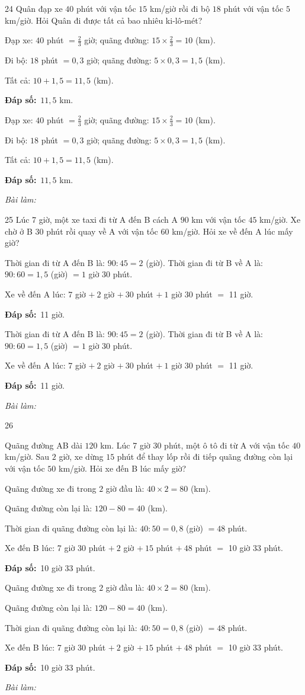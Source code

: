 \documentclass[11pt]{article}
\newif\ifsol \soltrue
\providecommand{\AnsWord}{Đáp số}
\newcommand{\dapso}[1]{\par\textbf{\AnsWord:}\ #1}
\newcommand{\probsol}[1]{%
  \begin{lrbox}{\solmeasure}\begin{minipage}{\dimexpr\linewidth-24pt\relax}#1\end{minipage}\end{lrbox}%
  \ifsol
    \begin{solbox}#1\end{solbox}%
  \else
    \setlength{\solht}{\dimexpr\ht\solmeasure+\dp\solmeasure+0.85cm\relax}%
    \ifdim\solht<1.35cm\setlength{\solht}{1.35cm}\fi
    \begin{tcolorbox}[colback=white,colframe=Line,boxrule=0.8pt,arc=5pt,
      left=8pt,right=8pt,top=4pt,bottom=4pt,height=\solht]{\footnotesize\color{Slate}\itshape\WorkWord}\end{tcolorbox}%
  \fi}
\newcommand{\gap}{\vspace{0.3cm}}
\def\WorkWord{Bài làm:}
\def\AnsWord{Đáp số}
\begin{document}
\gap
\begin{probbox}{24}{\relax}
Quân đạp xe $40$ phút với vận tốc $15$ km/giờ rồi đi bộ $18$ phút với vận tốc $5$ km/giờ. Hỏi Quân đi được tất cả bao nhiêu ki-lô-mét?
\end{probbox}
\probsol{
Đạp xe: $40$ phút $=\frac23$ giờ; quãng đường: $15\times\frac23=10$ (km).\par
Đi bộ: $18$ phút $=0{,}3$ giờ; quãng đường: $5\times0{,}3=1{,}5$ (km).\par
Tất cả: $10+1{,}5=11{,}5$ (km).
\dapso{$11{,}5$ km.}}
\gap
\begin{probbox}{25}{\relax}
Lúc 7 giờ, một xe taxi đi từ A đến B cách A $90$ km với vận tốc $45$ km/giờ. Xe chờ ở B $30$ phút rồi quay về A với vận tốc $60$ km/giờ. Hỏi xe về đến A lúc mấy giờ?
\end{probbox}
\probsol{
Thời gian đi từ A đến B là: $90:45=2$ (giờ). Thời gian đi từ B về A là: $90:60=1{,}5$ (giờ) $=1$ giờ $30$ phút.\par
Xe về đến A lúc: 7 giờ $+\ 2$ giờ $+\ 30$ phút $+\ 1$ giờ $30$ phút $=$ 11 giờ.
\dapso{11 giờ.}}
\gap
\begin{probbox}{26}{\relax}
\begin{minipage}[t]{0.56\linewidth}
Quãng đường AB dài $120$ km. Lúc 7 giờ 30 phút, một ô tô đi từ A với vận tốc $40$ km/giờ. Sau $2$ giờ, xe dừng $15$ phút để thay lốp rồi đi tiếp quãng đường còn lại với vận tốc $50$ km/giờ. Hỏi xe đến B lúc mấy giờ?
\end{minipage}\hfill
\begin{minipage}[t]{0.4\linewidth}\vspace{4pt}\centering
{}
\end{minipage}
\end{probbox}
\probsol{
Quãng đường xe đi trong $2$ giờ đầu là: $40\times2=80$ (km).\par
Quãng đường còn lại là: $120-80=40$ (km).\par
Thời gian đi quãng đường còn lại là: $40:50=0{,}8$ (giờ) $=48$ phút.\par
Xe đến B lúc: 7 giờ 30 phút $+\ 2$ giờ $+\ 15$ phút $+\ 48$ phút $=$ 10 giờ 33 phút.
\dapso{10 giờ 33 phút.}}
\end{document}
